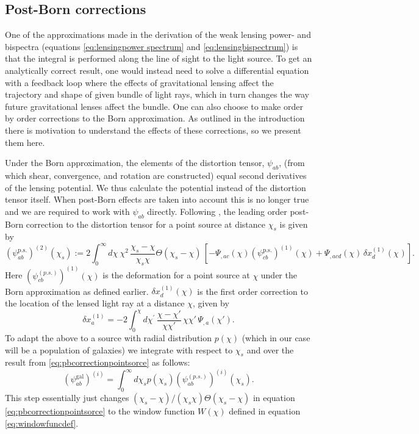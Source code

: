 \documentclass[11pt]{article} %
\begin{document}
\subsection{Post-Born corrections}
One of the approximations made in the derivation of the weak lensing power- and bispectra (equations \eqref{eq:lensingpower spectrum} and \eqref{eq:lensingbispectrum}) is that the integral is performed along the line of sight to the light source. To get an analytically correct result, one would instead need to solve a differential equation with a feedback loop where the effects of gravitational lensing affect the trajectory and shape of given bundle of light rays, which in turn changes the way future gravitational lenses affect the bundle. One can also choose to make order by order corrections to the Born approximation. As outlined in the introduction there is motivation to understand the effects of these corrections, so we present them here.

Under the Born approximation, the elements of the distortion tensor, $\psi_{ab}$, (from which shear, convergence, and rotation are constructed) equal second derivatives of the lensing potential. We thus calculate the potential instead of the distortion tensor itself. When post-Born effects are taken into account this is no longer true and we are required to work with $\psi_{ab}$ directly. Following \cite{postborn_pratten_lewis}, the leading order post-Born correction to the distortion tensor for a point source at distance $\chi_s$ is given by
\begin{equation}
    \left( \psi_{ab}^{\text{p.s.}}  \right)^{(2)}(\chi_s) := 2 \int^{\infty}_0 d \chi^{} \, \chi^2 \, \frac{\chi_s - \chi}{\chi_s\chi}\Theta(\chi_s - \chi) \, \left[ - \Psi_{,ac} (\chi) \left(\psi^{\text{p.s.}}_{cb}\right)^{(1)} (\chi) + \Psi_{,acd} (\chi) \, \delta x_d^{(1)} (\chi^{}) \right].
    \label{eq:pbcorrectionpointsorce}
\end{equation}
Here $\left(\psi_{cb}^{(p.s.)}\right)^{(1)}(\chi)$ is the deformation for a point source at $\chi$ under the Born approximation as defined earlier. $\delta x_d^{(1)}(\chi)$ is the first order correction to the location of the lensed light ray at a distance $\chi$, given by
\begin{equation}
\delta x_a^{(1)} = -2 \int^{\chi}_0 d \chi^{\prime} \, \frac{\chi-\chi'}{\chi\chi'} \, \chi \chi' \, \Psi_{,a} (\chi').
\end{equation}
To adapt the above to a source with radial distribution $p(\chi)$ (which in our case will be a population of galaxies) we integrate with respect to $\chi_s$ and over the result from \eqref{eq:pbcorrectionpointsorce} as follows:
\begin{equation}
    (\psi_{ab}^{\text{gal}})^{(i)} = \int_0^\infty d \chi_s p(\chi_s)\left(\psi_{ab}^{(p.s.)}\right)^{(i)}(\chi_s).
\end{equation}
This step essentially just changes $(\chi_s - \chi)/(\chi_s\chi)\Theta(\chi_s-\chi)$ in equation \eqref{eq:pbcorrectionpointsorce} to the window function $W(\chi)$ defined in equation \eqref{eq:windowfuncdef}.
\end{document}
